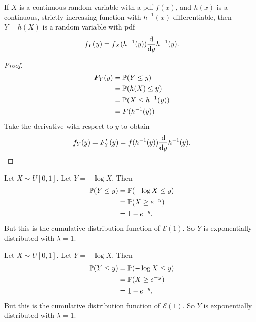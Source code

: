 %
\begin{note}
  \begin{field}
    \begin{thm}
      If $X$ is a continuous random variable with a pdf $f(x)$, and $h(x)$ is a continuous, strictly increasing function with $h^{-1}(x)$ differentiable, then $Y = h(X)$ is a random variable with pdf
      \[
        f_Y(y) = f_X(h^{-1}(y))\frac{\d }{\d y}h^{-1}(y).
      \]
    \end{thm}
  \end{field}
  \begin{field}
    \begin{proof}
      \begin{align*}
        F_Y(y) &= \P(Y \leq y)\\
        &= \P(h(X) \leq y)\\
        &= \P(X \leq h^{-1}(y))\\
        &= F(h^{-1}(y))
      \end{align*}
      Take the derivative with respect to $y$ to obtain
      \[
        f_Y(y) = F'_Y(y) = f(h^{-1}(y))\frac{\d}{\d y}h^{-1}(y).\qedhere
      \]
    \end{proof}
  \end{field}
  \xplain{}%
\end{note}

\begin{note}
  \begin{field}
    \begin{eg}
      Let $X\sim U[0, 1]$. Let $Y = -\log X$. Then
      \begin{align*}
        \P(Y \leq y) &= \P(-\log X \leq y)\\
        &= \P(X \geq e^{-y})\\
        &= 1 - e^{-y}.
      \end{align*}
      But this is the cumulative distribution function of $\mathcal{E}(1)$. So $Y$ is exponentially distributed with $\lambda = 1$.
    \end{eg}
  \end{field}
  \begin{field}
    \begin{eg}
      Let $X\sim U[0, 1]$. Let $Y = -\log X$. Then
      \begin{align*}
        \P(Y \leq y) &= \P(-\log X \leq y)\\
        &= \P(X \geq e^{-y})\\
        &= 1 - e^{-y}.
      \end{align*}
      But this is the cumulative distribution function of $\mathcal{E}(1)$. So $Y$ is exponentially distributed with $\lambda = 1$.
    \end{eg}
  \end{field}
  \xplain{}%
\end{note}

